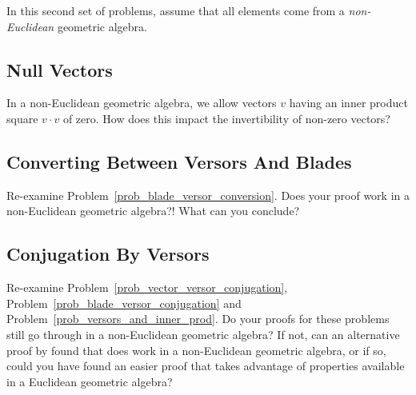 \documentclass{article}
\begin{document}
In this second set of problems, assume that all elements
come from a \emph{non-Euclidean} geometric algebra.

\subsection{Null Vectors}

In a non-Euclidean geometric algebra, we allow vectors $v$ having an inner product
square $v\cdot v$ of zero.  How does this impact the invertibility of non-zero vectors?

\subsection{Converting Between Versors And Blades}

Re-examine Problem~\ref{prob_blade_versor_conversion}.  Does your
proof work in a non-Euclidean geometric algebra?!  What can you conclude?

\subsection{Conjugation By Versors}

Re-examine Problem~\ref{prob_vector_versor_conjugation},
Problem~\ref{prob_blade_versor_conjugation} and Problem~\ref{prob_versors_and_inner_prod}.
Do your proofs for these problems still
go through in a non-Euclidean geometric algebra?  If not, can an alternative
proof by found that does work in a non-Euclidean geometric algebra, or if so,
could you have found an easier proof that takes advantage of properties
available in a Euclidean geometric algebra?
\end{document}
